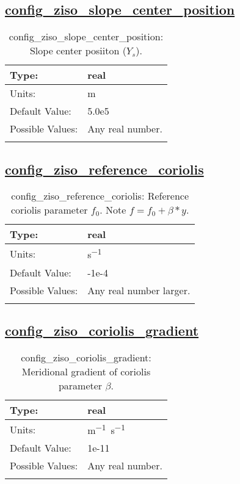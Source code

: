 \subsection[config\_ziso\_slope\_center\_position]{\hyperref[sec:nm_tab_ziso]{config\_ziso\_slope\_center\_position}}
\label{subsec:nm_sec_config_ziso_slope_center_position}
\begin{center}
\begin{longtable}{| p{2.0in} || p{4.0in} |}
    \hline
    Type: & real \\
    \hline
    Units: & \si{m} \\
    \hline
    Default Value: & 5.0e5 \\
    \hline
    Possible Values: & Any real number. \\
    \hline
    \caption{config\_ziso\_slope\_center\_position: Slope center posiiton ($Y_s$).}
\end{longtable}
\end{center}
\subsection[config\_ziso\_reference\_coriolis]{\hyperref[sec:nm_tab_ziso]{config\_ziso\_reference\_coriolis}}
\label{subsec:nm_sec_config_ziso_reference_coriolis}
\begin{center}
\begin{longtable}{| p{2.0in} || p{4.0in} |}
    \hline
    Type: & real \\
    \hline
    Units: & \si{s^{-1}} \\
    \hline
    Default Value: & -1e-4 \\
    \hline
    Possible Values: & Any real number larger. \\
    \hline
    \caption{config\_ziso\_reference\_coriolis: Reference coriolis parameter $f_0$. Note $f = f_0 + \beta * y$.}
\end{longtable}
\end{center}
\subsection[config\_ziso\_coriolis\_gradient]{\hyperref[sec:nm_tab_ziso]{config\_ziso\_coriolis\_gradient}}
\label{subsec:nm_sec_config_ziso_coriolis_gradient}
\begin{center}
\begin{longtable}{| p{2.0in} || p{4.0in} |}
    \hline
    Type: & real \\
    \hline
    Units: & \si{m^{-1}.s^{-1}} \\
    \hline
    Default Value: & 1e-11 \\
    \hline
    Possible Values: & Any real number. \\
    \hline
    \caption{config\_ziso\_coriolis\_gradient: Meridional gradient of coriolis parameter $\beta$.}
\end{longtable}
\end{center}
